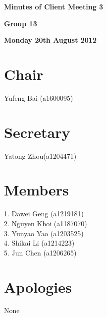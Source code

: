\documentclass[11pt, a4paper]{article}
\begin{document}
 



\vspace*{15pt}

\begin{center}
\huge \bf Minutes of Client Meeting 3
\end{center}


\begin{center}
\Large \bf Group 13
\end{center}

\begin{center}
\Large \bf Monday 20th August 2012
\end{center}

\section*{Chair}
Yufeng Bai (a1600095)

\section*{Secretary}
Yatong Zhou(a1204471)

\section*{Members}
1. Dawei Geng (a1219181)\\
2. Nguyen Khoi (a1187070)\\
3. Yunyao Yao (a1203525)\\
4. Shikai Li (a1214223)\\
5. Jun Chen (a1206265)
\vspace*{10pt}

\section*{Apologies}
None

\end{document}
